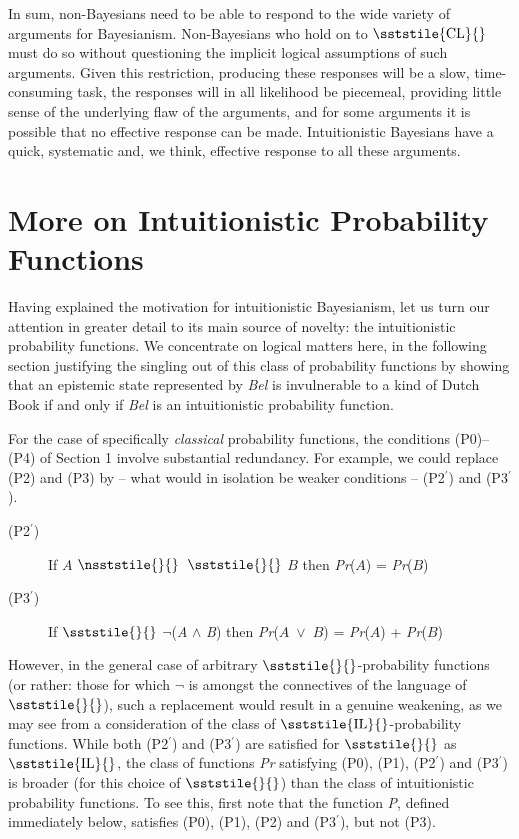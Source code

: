 In sum, non-Bayesians need to be able to respond to the wide variety of arguments for Bayesianism. Non-Bayesians who hold on to {\small \(\sststile{\mathrm{CL}}{}\)} must do so without questioning the implicit logical assumptions of such arguments. Given this restriction, producing these responses will be a slow, time-consuming task, the responses will in all likelihood be piecemeal, providing little sense of the underlying flaw of the arguments, and for some arguments it is possible that no effective response can be made. Intuitionistic Bayesians have a quick, systematic and, we think, effective response to all these arguments.

\section{More on Intuitionistic Probability Functions}
Having explained the motivation for intuitionistic Bayesianism, let us turn our attention in greater detail to its main source of novelty: the intuitionistic probability functions. We concentrate on logical matters here, in the following section justifying the singling out of this class of probability functions by showing that an epistemic state represented by \textit{Bel} is invulnerable to a kind of Dutch Book if and only if \textit{Bel} is an intuitionistic probability function. 

For the case of specifically \textit{classical} probability functions, the conditions (P0)--(P4) of Section 1 involve substantial redundancy. For example, we could replace (P2) and (P3) by -- what would in isolation be weaker conditions -- (P2\(^\prime\)) and (P3\(^\prime\)).

\begin{description}
\item[(P2\(^\prime\))]If \(A\) {\small \(\nsststile{}{}\)}~{\small \(\sststile{}{}\)} \(B\) then \textit{Pr}(\(A\)) = \textit{Pr}(\(B\))
\item[(P3\(^\prime\))]If {\small \(\sststile{}{}\)} ${\lnot}$(\textit{A }${\wedge}$\textit{ B}) then \textit{Pr}(\(A\)~${\vee}$~\(B\)) = \textit{Pr}(\(A\)) + \textit{Pr}(\(B\))
\end{description}

\noindent However, in the general case of arbitrary {\small \(\sststile{}{}\)}{}-probability functions (or rather: those for which ${\lnot}$ is amongst the connectives of the language of {\small \(\sststile{}{}\)}), such a replacement would result in a genuine weakening, as we may see from a consideration of the class of {\small \(\sststile{\mathrm{IL}}{}\)}{}-probability functions. While both (P2\(^\prime\)) and (P3\(^\prime\)) are satisfied for {\small \(\sststile{}{}\)} as {\small \(\sststile{\mathrm{IL}}{}\)}, the class of functions \textit{Pr} satisfying (P0), (P1), (P2\(^\prime\)) and (P3\(^\prime\)) is broader (for this choice of {\small \(\sststile{}{}\)}) than the class of intuitionistic probability functions. To see this, first note that the function \textit{P}, defined immediately below, satisfies (P0), (P1), (P2) and (P3\(^\prime\)), but not (P3).

